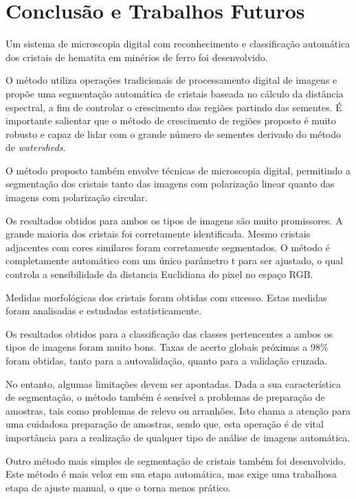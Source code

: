 
\chapter{Conclusão e Trabalhos Futuros}

Um sistema de microscopia digital com reconhecimento e classificação
automática dos cristais de hematita em minérios de ferro foi
desenvolvido.

O método utiliza operações tradicionais de processamento digital de
imagens e propõe uma segmentação automática de cristais baseada no
cálculo da distância espectral, a fim de controlar o crescimento das
regiões partindo das sementes. É importante salientar que o método de
crescimento de regiões proposto é muito robusto e capaz de lidar com o
grande número de sementes derivado do método de \textit{watersheds}.

O método proposto também envolve técnicas de microscopia digital,
permitindo a segmentação dos cristais tanto das imagens com polarização
linear quanto das imagens com polarização circular.

Os resultados obtidos para ambos os tipos de imagens são muito
promissores. A grande maioria dos cristais foi corretamente
identificada. Mesmo cristais adjacentes com cores similares foram
corretamente segmentados. O método é completamente automático com um
único parâmetro t para ser ajustado, o qual controla a sensibilidade da
distancia Euclidiana do pixel no espaço RGB.

Medidas morfológicas dos cristais foram obtidas com sucesso. Estas
medidas foram analisadas e estudadas estatisticamente.

Os resultados obtidos para a classificação das classes pertencentes a
ambos os tipos de imagens foram muito bons. Taxas de acerto globais
próximas a 98\% foram obtidas, tanto para a autovalidação, quanto para a
validação cruzada.

No entanto, algumas limitações devem ser apontadas. Dada a sua
característica de segmentação, o método também é sensível a problemas de
preparação de amostras, tais como problemas de relevo ou arranhões. Isto
chama a atenção para uma cuidadosa preparação de amostras, sendo que,
esta operação é de vital importância para a realização de qualquer tipo
de análise de imagens automática.

Outro método mais simples de segmentação de cristais também foi
desenvolvido. Este método é mais veloz em sua etapa automática, mas
exige uma trabalhosa etapa de ajuste manual, o que o torna menos
prático.


